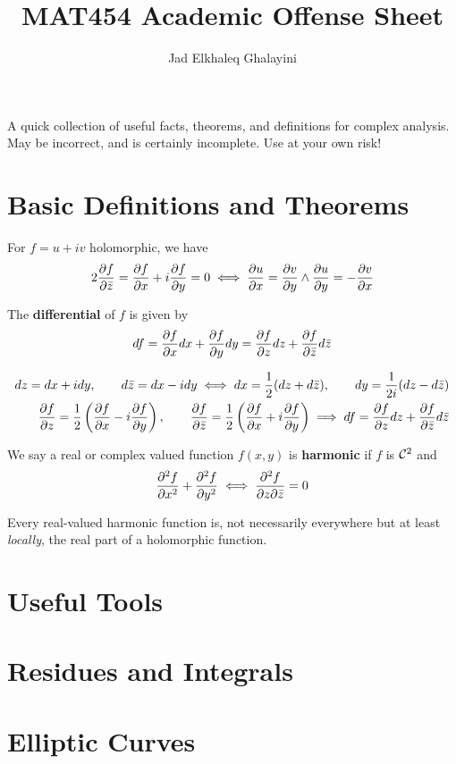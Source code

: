 \documentclass{article}
\title{MAT454 Academic Offense Sheet}
\author{Jad Elkhaleq Ghalayini}
\begin{document}
\maketitle

A quick collection of useful facts, theorems, and definitions for complex analysis. May be incorrect, and is certainly incomplete. Use at your own risk!

\tableofcontents

\newpage

\section{Basic Definitions and Theorems}
For \(f = u + iv\) holomorphic, we have
\begin{equation}
  2{\frac{\partial {f}}{\partial {\bar{z}}}} = {\frac{\partial {f}}{\partial {x}}} + i{\frac{\partial {f}}{\partial {y}}} = 0
  \iff {\frac{\partial {u}}{\partial {x}}} = {\frac{\partial {v}}{\partial {y}}} \land {\frac{\partial {u}}{\partial {y}}} = -{\frac{\partial {v}}{\partial {x}}}
\end{equation}
\begin{definition}
The \textbf{differential} of \(f\) is given by
\begin{equation}
  df = {\frac{\partial {f}}{\partial {x}}}dx + {\frac{\partial {f}}{\partial {y}}}dy = {\frac{\partial {f}}{\partial {z}}}dz + {\frac{\partial {f}}{\partial {\bar{z}}}}d\bar{z}
\end{equation}
\end{definition}
\begin{align}
  dz = dx + idy, \qquad d\bar{z} = dx - idy \iff
  dx = \frac{1}{2}(dz + d\bar{z}), \qquad dy = \frac{1}{2i}(dz - d\bar{z}) \\
  {\frac{\partial {f}}{\partial {z}}} = \frac{1}{2}\left({\frac{\partial {f}}{\partial {x}}} - i{\frac{\partial {f}}{\partial {y}}}\right),
    \qquad {\frac{\partial {f}}{\partial {\bar{z}}}}
    = \frac{1}{2}\left({\frac{\partial {f}}{\partial {x}}} + i{\frac{\partial {f}}{\partial {y}}}\right)
    \implies df = {\frac{\partial {f}}{\partial {z}}}dz + {\frac{\partial {f}}{\partial {\bar{z}}}}d\bar{z}
\end{align}
\begin{definition}[Harmonic]
We say a real or complex valued function \(f(x, y)\) is \textbf{harmonic} if \(f\) is \(\mathcal{C}^2\) and
\begin{equation}
  {\frac{\partial {^2f}}{\partial {x^2}}} + {\frac{\partial {^2f}}{\partial {y^2}}} \iff {\frac{\partial {^2f}}{\partial {z\partial\bar{z}}}} = 0
\end{equation}
\end{definition}
\begin{proposition}
  Every real-valued harmonic function is, not necessarily everywhere but at least \textit{locally}, the real part of a holomorphic function.
\end{proposition}

\section{Useful Tools}

\section{Residues and Integrals}

\section{Elliptic Curves}
\end{document}
